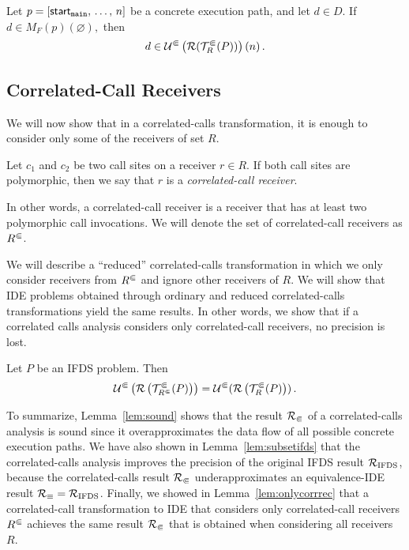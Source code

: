 \begin{lemma}[Soundness]\label{lem:sound}
  Let $p=[\textsf{start}_\texttt{main},\,\dots,\,n]$ be a concrete execution path, and let $d\in D$.
  If $d\in M_F(p)(\varnothing),$
  then
  \begin{equation}
    d\in \mathcal U^\Subset\left(\mathcal R(\mathcal T^\Subset_R(P))\right)(n)\,.
  \end{equation}
\end{lemma}

\subsection{Correlated-Call Receivers}\label{sec:ccreceivers}
We will now show that in a correlated-calls transformation, it is enough to consider only some of the receivers of set $R$.

\begin{definition}
Let $c_1$ and $c_2$ be two call sites on a receiver $r\in R$.
  If both call sites are polymorphic, then we say that $r$ is a \textit{correlated-call receiver}.
\end{definition}
In other words, a correlated-call receiver is a receiver that has at least two polymorphic call invocations.
We will denote the set of correlated-call receivers as ${R^\Subset}$.

We will describe a ``reduced'' correlated-calls transformation in which we only consider receivers from ${R^\Subset}$ and ignore other receivers of $R$. We will show that IDE problems obtained through ordinary and reduced correlated-calls transformations yield the same results.
In other words, we show that if a correlated calls analysis considers only correlated-call receivers, no precision is lost.

\begin{lemma}\label{lem:onlycorrrec}
  Let $P$ be an IFDS problem. Then
  \begin{equation}
    \mathcal U^\Subset\left(\mathcal R\left(\mathcal T^\Subset_{R^\Subset}(P)\right)\right)=\mathcal U^\Subset(\mathcal R\left(\mathcal T^\Subset_R(P)\right))\,.
  \end{equation}
\end{lemma}

To summarize, Lemma~\ref{lem:sound} shows that the result $\mathcal R_\Subset$ of a correlated-calls analysis is sound since it overapproximates the data flow of all possible concrete execution paths.
We have also shown in Lemma~\ref{lem:subsetifds} that the correlated-calls analysis improves the precision of the original IFDS result $\mathcal R_\text{IFDS}$, because the correlated-calls result $\mathcal R_\Subset$ underapproximates an equivalence-IDE result $\mathcal R_\equiv=\mathcal R_\text{IFDS}$.
Finally, we showed in Lemma~\ref{lem:onlycorrrec} that a correlated-call transformation to IDE that considers only correlated-call receivers ${R^\Subset}$ achieves the same result $\mathcal R_\Subset$ that is obtained when considering all receivers $R$.

